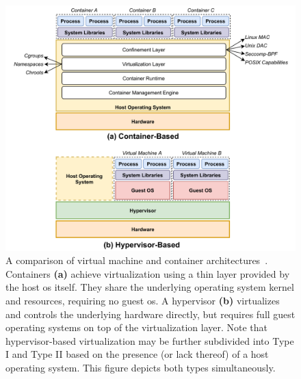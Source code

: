 
\begin{figure}[htbp]
  \centering
  \includegraphics[width=1\linewidth]{figs/background/virtualization.pdf}
  \caption[A comparison of virtual machine and container architectures]{
    A comparison of virtual machine and container
    architectures~\cite{sultan2019_container_security, eder2016_hypervisor_container}.
    Containers \textbf{(a)} achieve virtualization using a thin layer provided by the host
    \gls{os} itself. They share the underlying operating system kernel and resources,
    requiring no guest \gls{os}. A hypervisor \textbf{(b)} virtualizes and controls the
    underlying hardware directly, but requires full guest operating systems on top of the
    virtualization layer. Note that hypervisor-based virtualization may be further
    subdivided into Type I and Type II based on the presence (or lack thereof) of a host
    operating system. This figure depicts both types simultaneously.
  }%
  \label{fig:virt}
\end{figure}

